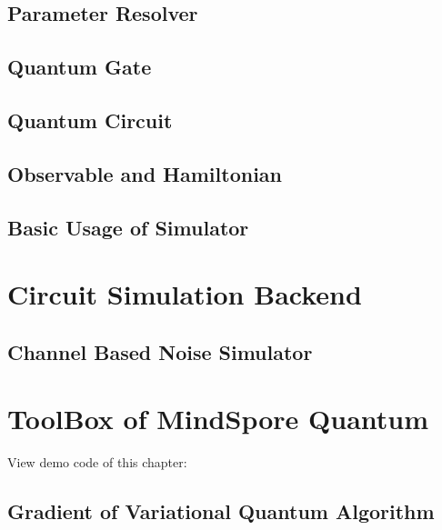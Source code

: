 \documentclass[pra,twocolumn,superscriptaddress,floatfix,nofootinbib,amsmath,amssymb]{revtex4-1}
\numberwithin{equation}{section}
\numberwithin{figure}{section}
\numberwithin{table}{section}
\begin{document}
\subsection{Parameter Resolver}


\subsection{Quantum Gate}


\subsection{Quantum Circuit}


\subsection{Observable and Hamiltonian}


\subsection{Basic Usage of Simulator}
\label{sec:sim_basic_usage}



\section{Circuit Simulation Backend}
\label{sec:backend}



\subsection{Channel Based Noise Simulator}


\section{ToolBox of MindSpore Quantum}
\label{sec:toolbox}

View demo code of this chapter: 

\subsection{Gradient of Variational Quantum Algorithm}

\end{document}
